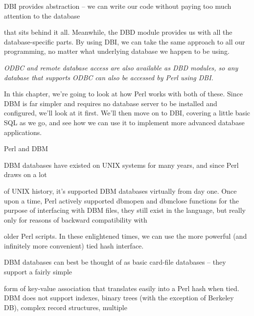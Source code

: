 \documentclass[a4paper,11pt]{book}
\begin{document}
\noindent 

\noindent DBI provides abstraction -- we can write our code without paying too much attention to the database

\noindent that sits behind it all. Meanwhile, the DBD module provides us with all the database-specific parts. By using DBI, we can take the same approach to all our programming, no matter what underlying database we happen to be using.

\noindent 

\noindent \textit{ODBC and remote database access are also available as DBD modules, so any database that supports ODBC can also be accessed by Perl using DBI.}

\noindent 

\noindent In this chapter, we're going to look at how Perl works with both of these. Since DBM is far simpler and requires no database server to be installed and configured, we'll look at it first. We'll then move on to DBI, covering a little basic SQL as we go, and see how we can use it to implement more advanced database applications.

\noindent  

\noindent  

\noindent  

\noindent  

\noindent 

\noindent Perl and DBM

\noindent 

\noindent DBM  databases  have existed on  UNIX  systems  for  many  years,  and  since  Perl  draws  on  a  lot

\noindent of UNIX  history,  it's supported  DBM  databases  virtually  from  day  one.  Once  upon  a  time,  Perl actively  supported dbmopen and  dbmclose functions  for  the  purpose  of  interfacing  with  DBM files,  they still  exist  in the  language,  but  really  only  for  reasons  of  backward  compatibility  with

\noindent older Perl scripts.  In these  enlightened  times,  we  can  use  the  more powerful  (and  infinitely  more convenient) tied  hash interface.

\noindent 

\noindent DBM  databases  can  best be thought  of as  basic  card-file  databases  --  they  support  a  fairly  simple

\noindent form of key-value  association that  translates  easily  into  a  Perl  hash  when  tied.  DBM  does  not  support indexes,  binary trees  (with the  exception  of  Berkeley  DB),  complex  record  structures,  multiple
\end{document}
